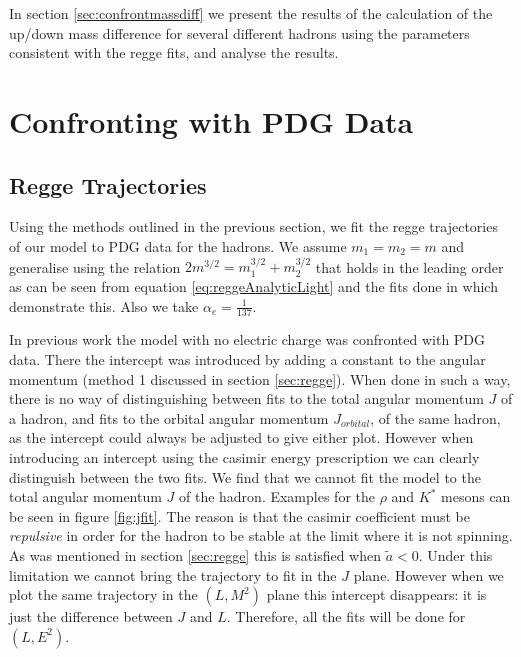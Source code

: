 \documentclass[11pt,a4paper]{article}
\begin{document}
In section \ref{sec:confrontmassdiff} we present the results of the calculation of the up/down mass difference for several different hadrons using the parameters consistent with the regge fits, and analyse the results.

\FloatBarrier
\section{Confronting with PDG Data}

\subsection{Regge Trajectories}
\label{sec:reggefit}

Using the methods outlined in the previous section, we fit the regge trajectories of our model to PDG data for the hadrons. We assume $m_{1}=m_{2}=m$ and generalise using the relation $2m^{3/2}=m_1^{3/2}+m_2^{3/2}$ that holds in the leading order as can be seen from equation \ref{eq:reggeAnalyticLight} and the fits done in \cite{Sonnenschein14} which demonstrate this. Also we take $\alpha_{e}=\frac{1}{137}$.

In previous work \cite{Sonnenschein14,Sonnenschein15} the model with no electric charge was confronted with PDG data. There the intercept was introduced by adding a constant to the angular momentum (method 1 discussed in section \ref{sec:regge}). When done in such a way, there is no way of distinguishing between fits to the total angular momentum $J$ of a hadron, and fits to the orbital angular momentum $J_{orbital}$, of the same hadron, as the intercept could always be adjusted to give either plot. However when introducing an intercept using the casimir energy prescription we can clearly distinguish between the two fits. We find that we cannot fit the model to the total angular momentum $J$ of the hadron. Examples for the $\rho$ and $K^{*}$ mesons can be seen in figure \ref{fig:jfit}. The reason is that the casimir coefficient must be \emph{repulsive} in order for the hadron to be stable at the limit where it is not spinning. As was mentioned in section \ref{sec:regge} this is satisfied when $\tilde{a}<0$. Under this limitation we cannot bring the trajectory to fit in the $J$ plane. However when we plot the same trajectory in the $\left(L,M^2\right)$ plane this intercept disappears: it is just the difference between $J$ and $L$. Therefore, all the fits will be done for $\left(L,E^{2}\right)$.
\end{document}
